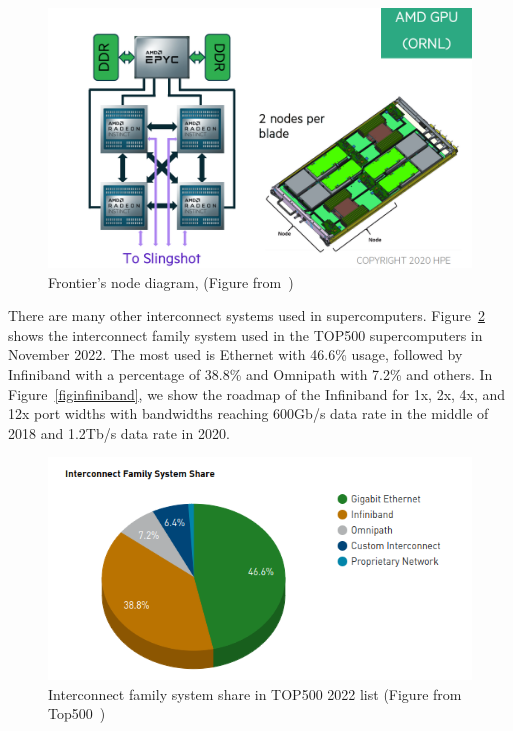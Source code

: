 \begin{figure}[h!]\centering
\includegraphics[scale=0.2]{figures/frontier_node_diagram_lr.png}
\caption{Frontier's node diagram, (Figure from~\cite{frontier})}
\label{figfrontierdiag}
\end{figure}

There are many other interconnect systems used in supercomputers. Figure~\ref{figinterconnect} shows the interconnect family system used in the TOP500 supercomputers in November 2022. The most used is Ethernet with 46.6\% usage, followed by Infiniband with a percentage of 38.8\% and Omnipath with 7.2\% and others. In Figure~\ref{figinfiniband}, we show the roadmap of the Infiniband for 1x, 2x, 4x, and 12x port widths with bandwidths reaching 600Gb/s data rate in the middle of 2018 and 1.2Tb/s data rate in 2020.

\begin{figure}[hb]\centering
\includegraphics[scale=0.5]{figures/interconnect.png}
\caption{Interconnect family system share in TOP500 2022 list (Figure from Top500~\cite{top500})}
\label{figinterconnect}
\end{figure}


